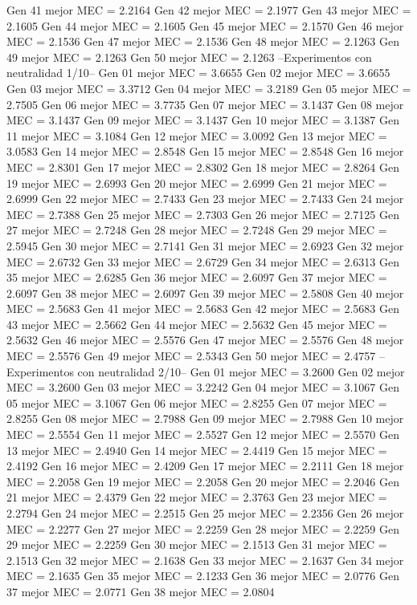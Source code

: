 Gen 41 mejor MEC = 2.2164
Gen 42 mejor MEC = 2.1977
Gen 43 mejor MEC = 2.1605
Gen 44 mejor MEC = 2.1605
Gen 45 mejor MEC = 2.1570
Gen 46 mejor MEC = 2.1536
Gen 47 mejor MEC = 2.1536
Gen 48 mejor MEC = 2.1263
Gen 49 mejor MEC = 2.1263
Gen 50 mejor MEC = 2.1263
--Experimentos con neutralidad 1/10--
Gen 01 mejor MEC = 3.6655
Gen 02 mejor MEC = 3.6655
Gen 03 mejor MEC = 3.3712
Gen 04 mejor MEC = 3.2189
Gen 05 mejor MEC = 2.7505
Gen 06 mejor MEC = 3.7735
Gen 07 mejor MEC = 3.1437
Gen 08 mejor MEC = 3.1437
Gen 09 mejor MEC = 3.1437
Gen 10 mejor MEC = 3.1387
Gen 11 mejor MEC = 3.1084
Gen 12 mejor MEC = 3.0092
Gen 13 mejor MEC = 3.0583
Gen 14 mejor MEC = 2.8548
Gen 15 mejor MEC = 2.8548
Gen 16 mejor MEC = 2.8301
Gen 17 mejor MEC = 2.8302
Gen 18 mejor MEC = 2.8264
Gen 19 mejor MEC = 2.6993
Gen 20 mejor MEC = 2.6999
Gen 21 mejor MEC = 2.6999
Gen 22 mejor MEC = 2.7433
Gen 23 mejor MEC = 2.7433
Gen 24 mejor MEC = 2.7388
Gen 25 mejor MEC = 2.7303
Gen 26 mejor MEC = 2.7125
Gen 27 mejor MEC = 2.7248
Gen 28 mejor MEC = 2.7248
Gen 29 mejor MEC = 2.5945
Gen 30 mejor MEC = 2.7141
Gen 31 mejor MEC = 2.6923
Gen 32 mejor MEC = 2.6732
Gen 33 mejor MEC = 2.6729
Gen 34 mejor MEC = 2.6313
Gen 35 mejor MEC = 2.6285
Gen 36 mejor MEC = 2.6097
Gen 37 mejor MEC = 2.6097
Gen 38 mejor MEC = 2.6097
Gen 39 mejor MEC = 2.5808
Gen 40 mejor MEC = 2.5683
Gen 41 mejor MEC = 2.5683
Gen 42 mejor MEC = 2.5683
Gen 43 mejor MEC = 2.5662
Gen 44 mejor MEC = 2.5632
Gen 45 mejor MEC = 2.5632
Gen 46 mejor MEC = 2.5576
Gen 47 mejor MEC = 2.5576
Gen 48 mejor MEC = 2.5576
Gen 49 mejor MEC = 2.5343
Gen 50 mejor MEC = 2.4757
--Experimentos con neutralidad 2/10--
Gen 01 mejor MEC = 3.2600
Gen 02 mejor MEC = 3.2600
Gen 03 mejor MEC = 3.2242
Gen 04 mejor MEC = 3.1067
Gen 05 mejor MEC = 3.1067
Gen 06 mejor MEC = 2.8255
Gen 07 mejor MEC = 2.8255
Gen 08 mejor MEC = 2.7988
Gen 09 mejor MEC = 2.7988
Gen 10 mejor MEC = 2.5554
Gen 11 mejor MEC = 2.5527
Gen 12 mejor MEC = 2.5570
Gen 13 mejor MEC = 2.4940
Gen 14 mejor MEC = 2.4419
Gen 15 mejor MEC = 2.4192
Gen 16 mejor MEC = 2.4209
Gen 17 mejor MEC = 2.2111
Gen 18 mejor MEC = 2.2058
Gen 19 mejor MEC = 2.2058
Gen 20 mejor MEC = 2.2046
Gen 21 mejor MEC = 2.4379
Gen 22 mejor MEC = 2.3763
Gen 23 mejor MEC = 2.2794
Gen 24 mejor MEC = 2.2515
Gen 25 mejor MEC = 2.2356
Gen 26 mejor MEC = 2.2277
Gen 27 mejor MEC = 2.2259
Gen 28 mejor MEC = 2.2259
Gen 29 mejor MEC = 2.2259
Gen 30 mejor MEC = 2.1513
Gen 31 mejor MEC = 2.1513
Gen 32 mejor MEC = 2.1638
Gen 33 mejor MEC = 2.1637
Gen 34 mejor MEC = 2.1635
Gen 35 mejor MEC = 2.1233
Gen 36 mejor MEC = 2.0776
Gen 37 mejor MEC = 2.0771
Gen 38 mejor MEC = 2.0804
